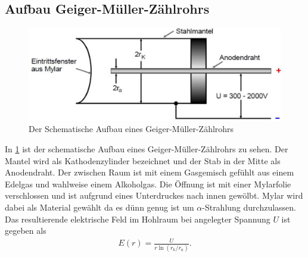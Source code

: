 \subsection{Aufbau Geiger-Müller-Zählrohrs}
\begin{figure}[h!]
\centering
\includegraphics[scale=0.5]{Grafiken/schema.pdf}
\caption{Der Schematische Aufbau eines Geiger-Müller-Zählrohrs \cite{V703}}
\label{Th1}
\end{figure}
In \cref{Th1} ist der schematische Aufbau eines Geiger-Müller-Zählrohrs zu sehen. Der Mantel wird als Kathodenzylinder bezeichnet und der Stab in der Mitte als Anodendraht. Der zwischen Raum ist mit einem Gasgemisch gefühlt aus einem Edelgas und wahlweise einem Alkoholgas. Die Öffnung ist mit einer Mylarfolie verschlossen und ist aufgrund eines Unterdruckes nach innen gewölbt. Mylar wird dabei als Material gewählt da es dünn genug ist um $\alpha$-Strahlung durchzulassen. Das resultierende elektrische Feld im Hohlraum bei angelegter Spannung $U$ ist gegeben als
\begin{align}
E\left(r\right)=\frac{U}{r\ln\left( r_k/r_a \right)}.
\end{align}

